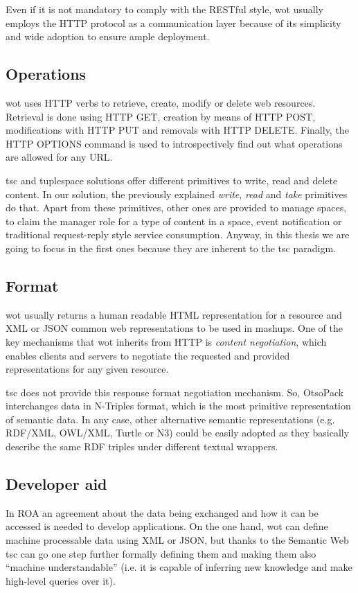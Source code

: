 Even if it is not mandatory to comply with the RESTful style, \ac{wot} usually employs the HTTP protocol as a communication layer because of its
simplicity and wide adoption to ensure ample deployment.

\subsection{Operations}
\ac{wot} uses HTTP verbs to retrieve, create, modify or delete web resources. Retrieval is done using HTTP GET, creation by means of HTTP POST,
modifications with HTTP PUT and removals with HTTP DELETE. Finally, the HTTP OPTIONS command is used to introspectively find out what operations are
allowed for any URL.

\ac{tsc} and tuplespace solutions offer different primitives to write, read and delete content. In our solution, the previously explained \textit{write},
\textit{read} and \textit{take} primitives do that. Apart from these primitives, other ones are provided to manage spaces, to claim the manager role
for a type of content in a space, event notification or traditional request-reply style service consumption. Anyway, in this thesis we are going to focus in the
first ones because they are inherent to the \ac{tsc} paradigm. %

\subsection{Format}
\ac{wot} usually returns a human readable HTML representation for a resource and XML or JSON common web representations to be used in mashups. One of the
key mechanisms that \ac{wot} inherits from HTTP is \textit{content negotiation}, which enables clients and servers to negotiate the requested and
provided representations for any given resource.

\ac{tsc} does not provide this response format negotiation mechanism. So, OtsoPack interchanges data in N-Triples format, which is the most primitive
representation of semantic data. In any case, other alternative semantic representations (e.g. RDF/XML, OWL/XML, Turtle or N3) could be
easily adopted as they basically describe the same RDF triples under different textual wrappers.

\subsection{Developer aid}%
In ROA an agreement about the data being exchanged and how it can be accessed is needed to develop applications.
On the one hand, \ac{wot} can define machine processable data using XML or JSON, but thanks to the Semantic Web \ac{tsc} can go one step
further formally defining them and making them also ``machine understandable'' (i.e. it is capable of inferring new knowledge and make
high-level queries over it).

